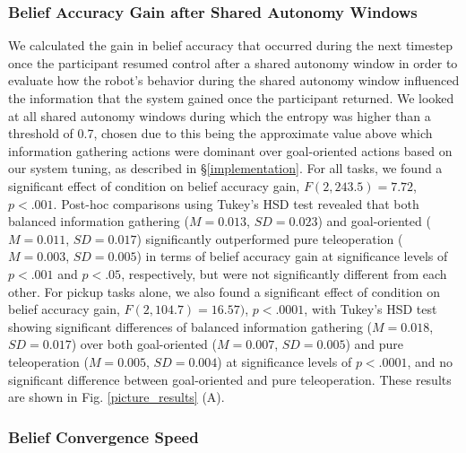 \documentclass[conference]{IEEEtran}
\begin{document}
\subsubsection{Belief Accuracy Gain after Shared Autonomy Windows}
We calculated the gain in belief accuracy that occurred during the next timestep once the participant resumed control after a shared autonomy window in order to evaluate how the robot's behavior during the shared autonomy window influenced the information that the system gained once the participant returned. We looked at all shared autonomy windows during which the entropy was higher than a threshold of 0.7, chosen due to this being the approximate value above which information gathering actions were dominant over goal-oriented actions based on our system tuning, as described in \S\ref{implementation}. For all tasks, we found a significant effect of condition on belief accuracy gain, $F(2, 243.5) = 7.72$, $p < .001$. Post-hoc comparisons using Tukey's HSD test revealed that both balanced information gathering ($M = 0.013$, $SD = 0.023$) and goal-oriented ($M = 0.011$, $SD = 0.017$) significantly outperformed pure teleoperation ($M = 0.003$, $SD = 0.005$) in terms of belief accuracy gain at significance levels of $p < .001$ and $p < .05$, respectively, but were not significantly different from each other. For pickup tasks alone, we also found a significant effect of condition on belief accuracy gain, $F(2, 104.7) = 16.57)$, $p < .0001$, with Tukey's HSD test showing significant differences of balanced information gathering ($M = 0.018$, $SD = 0.017$) over both goal-oriented ($M = 0.007$, $SD = 0.005$) and pure teleoperation ($M = 0.005$, $SD = 0.004$) at significance levels of $p < .0001$,  and no significant difference between goal-oriented and pure teleoperation. These results are shown in Fig. \ref{picture_results} (A).

\subsubsection{Belief Convergence Speed}
\end{document}
